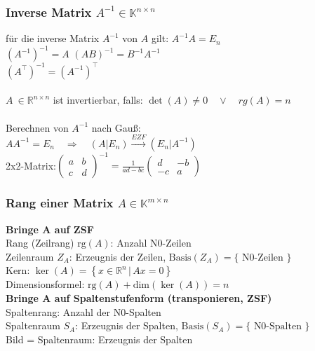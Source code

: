 \documentclass[6pt,a4paper]{scrartcl}
\newcommand{\dme}[2]{\ensuremath{\left\{#1\,\vert\,#2 \right\}}}
\newcommand{\enbrace}[1]{\ensuremath{\left(#1\right)}}
\begin{document}
\begin{multicols*}{4}
\subsubsection{Inverse Matrix $A^{-1}\in \mathbb K^{n\times n}$}
für die inverse Matrix $A^{-1}$ von $A$ gilt: $A^{-1}A=E_n$\\
$(A^{-1})^{-1}=A$ \qquad $(AB)^{-1}=B^{-1}A^{-1}$ \\
$(A^\top)^{-1}=(A^{-1})^\top$\\
\\
$A\ \in \mathbb R^{n\times n}$ ist invertierbar, falls: $\det (A) \ne 0 \quad \lor \quad rg(A)=n$\\
\\
Berechnen von $A^{-1}$ nach Gauß:\\
$AA^{-1}=E_n\quad\Rightarrow\quad (A|E_n)\overset{EZF}{\longrightarrow}(E_n|A^{-1})$\\
2x2-Matrix:$\enbrace{\begin{matrix}
a & b \\
c & d
\end{matrix}}^{-1} = \frac{1}{ad-bc}\begin{pmatrix}
d & -b \\
-c & a
\end{pmatrix}$

\subsubsection{Rang einer Matrix $A\in \mathbb K^{m\times n}$}
\textbf{Bringe A auf ZSF} \\
Rang (Zeilrang) $\mathrm{rg}(A)$: Anzahl N0-Zeilen \\     
Zeilenraum $Z_A$: Erzeugnis der Zeilen, $\text{Basis}(Z_A) = \{\text{ N0-Zeilen }\}$ \\
Kern: $\ker(A) = \dme{x \in \mathbb R^n}{Ax= 0}$ \\
Dimensionsformel: $\mathrm{rg}(A) + \mathrm{dim}(\ker(A)) = n$ \\
\textbf{Bringe A auf Spaltenstufenform (transponieren, ZSF)} \\
Spaltenrang: Anzahl der N0-Spalten\\
Spaltenraum $S_A$: Erzeugnis der Spalten, $\text{Basis}(S_A) = \{\text{ N0-Spalten }\}$ \\
Bild = Spaltenraum: Erzeugnis der Spalten 

\end{multicols*}
\end{document}
